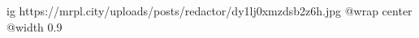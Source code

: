  
 
 
 
 

\ifcmt
  ig https://mrpl.city/uploads/posts/redactor/dy1lj0xmzdsb2z6h.jpg
  @wrap center
  @width 0.9
\fi
